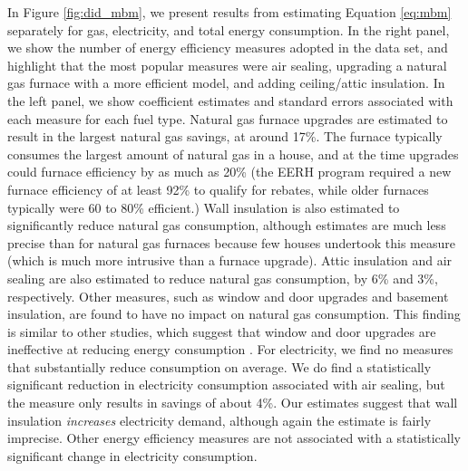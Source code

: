 \documentclass{article}
\begin{document}


In Figure \ref{fig:did_mbm}, we present results from estimating Equation \eqref{eq:mbm} separately for gas, electricity, and total energy consumption.  In the right panel, we show the number of energy efficiency measures adopted in the data set, and highlight that the most popular measures were air sealing, upgrading a natural gas furnace with a more efficient model, and adding ceiling/attic insulation.  In the left panel, we show coefficient estimates and standard errors associated with each measure for each fuel type.  Natural gas furnace upgrades are estimated to result in the largest natural gas savings, at around 17\%. The furnace typically consumes the largest amount of natural gas in a house, and at the time upgrades could furnace efficiency by as much as 20\% (the EERH program required a new furnace efficiency of at least 92\% to qualify for rebates, while older furnaces typically were 60 to 80\% efficient.) Wall insulation is also estimated to significantly reduce natural gas consumption, although estimates are much less precise than for natural gas furnaces because few houses undertook this measure (which is much more intrusive than a furnace upgrade). Attic insulation and air sealing are also estimated to reduce natural gas consumption, by 6\% and 3\%, respectively. Other measures, such as window and door upgrades and basement insulation, are found to have no impact on natural gas consumption. This finding is similar to other studies, which suggest that window and door upgrades are ineffective at reducing energy consumption \citep{giandomenico2020systematic}.  For electricity, we find no measures that substantially reduce consumption on average. We do find a statistically significant reduction in electricity consumption associated with air sealing, but the measure only results in savings of about 4\%. Our estimates suggest that wall insulation \textit{increases} electricity demand, although again the estimate is fairly imprecise. Other energy efficiency measures are not associated with a statistically significant change in electricity consumption.
\end{document}
